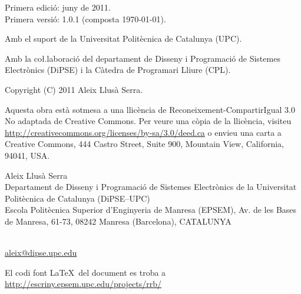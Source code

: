 {
  \thispagestyle{empty}

  \mbox{}

  \vfill

  Primera edició: juny de 2011. %
  \\
  {\small Primera versió: 1.0.1 (composta \today).} 

  \mbox{}

  {\footnotesize
  Amb el suport de la Universitat Politècnica de Catalunya (UPC).
  
  Amb la co\l.laboració del
  departament de Disseny i Programació de Sistemes Electrònics
  (DiPSE) i la Càtedra de Programari Lliure (CPL).
  }

  \mbox{}

  \cc\bysa

  {\small
  Copyright (C) 2011 Aleix Llusà Serra.
  

  {\footnotesize
    Aquesta obra està sotmesa a una llicència de Reconeixement-CompartirIgual 3.0 No adaptada de Creative Commons. Per veure una còpia de la llicència, visiteu \url{http://creativecommons.org/licenses/by-sa/3.0/deed.ca} o envieu una carta a Creative Commons, 444 Castro Street, Suite 900, Mountain View, California, 94041, USA.
  }


    Aleix Llusà Serra\\
    Departament de Disseny i Programació de Sistemes Electrònics
      de la Universitat Politècnica de Catalunya (DiPSE--UPC)\\
    Escola Politècnica Superior d'Enginyeria de Manresa (EPSEM),
    Av. de les Bases de Manresa, 61-73,
    08242 Manresa (Barcelona),
    CATALUNYA 
    }\\
    \url{aleix@dipse.upc.edu}

    {\footnotesize
      El codi font \LaTeX\ del document es troba a 
      \url{http://escriny.epsem.upc.edu/projects/rrb/}
    }
}

%



